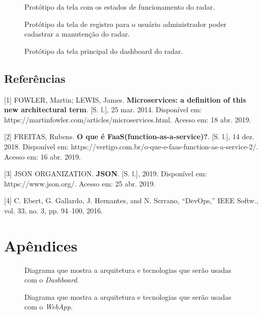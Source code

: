 \begin{figure}[ht]
	\caption{\label{fig:tela_status} Protótipo da tela com os estados de funcionamento do radar.}
\end{figure}\newpage

\begin{figure}[ht]
	\caption{\label{fig:tela_registro} Protótipo da tela de registro para o usuário administrador poder cadastrar a manutenção do radar.}
\end{figure}\newpage

\begin{figure}[ht]
	\caption{\label{fig:tela_dashboard} Protótipo da tela principal do dashboard do radar.}
\end{figure}\newpage

\section{Referências}

[1] FOWLER, Martin; LEWIS, James.
\textbf{Microservices: a definition of this new architectural term}.
[S. l.], 25 mar. 2014. Disponível em: https://martinfowler.com/articles/microservices.html. Acesso em: 18 abr. 2019.

[2] FREITAS, Rubens.
\textbf{O que é FaaS(function-as-a-service)?}.
[S. l.], 14 dez. 2018. Disponível em: https://vertigo.com.br/o-que-e-faas-function-as-a-service-2/. Acesso em: 16 abr. 2019.

[3] JSON ORGANIZATION.
\textbf{JSON}. [S. l.], 2019. Disponível em: https://www.json.org/. Acesso em: 25 abr. 2019.

[4] C. Ebert, G. Gallardo, J. Hernantes, and N. Serrano, “DevOps,” IEEE Softw., vol. 33, no. 3, pp. 94–100, 2016.

\chapter{Apêndices}
\begin{figure}[h!]
	\caption{\label{fig:diagrama-arq-dashboard} Diagrama que mostra a arquitetura e tecnologias que serão usadas com o \textit{Dashboard}.}
\end{figure}

\begin{figure}[h!]
	\caption{\label{fig:diagrama-arq-webApp} Diagrama que mostra a arquitetura e tecnologias que serão usadas com o \textit{WebApp}.}
\end{figure}

